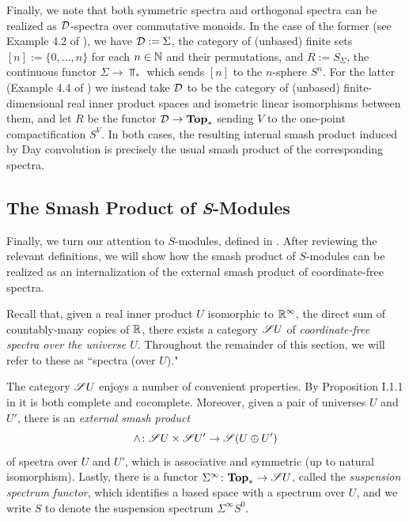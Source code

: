 \documentclass[openany, amssymb, psamsfonts]{amsart}
\theoremstyle{definition}
\numberwithin{equation}{section}
\begin{document}
Finally, we note that both symmetric spectra and orthogonal spectra can be realized as $\mathcal{D}$-spectra over commutative monoids. In the case of the former (see Example 4.2 of \cite{MMSS}), we have $\mathcal{D} := \Sigma$, the category of (unbased) finite sets $[n] := \{0, \dots, n\}$ for each $n \in \mathbb{N}$ and their permutations, and $R := S_\Sigma$, the continuous functor $\Sigma \to \Top_*$ which sends $[n]$ to the $n$-sphere $S^n$. For the latter (Example 4.4 of \cite{MMSS}) we instead take $\mathcal{D}$ to be the category of (unbased) finite-dimensional real inner product spaces and isometric linear isomorphisms between them, and let $R$ be the functor $\mathcal{D} \to \textbf{\textup{Top}}_*$ sending $V$ to the one-point compactification $S^V$. In both cases, the resulting internal smash product induced by Day convolution is precisely the usual smash product of the corresponding spectra.

\subsection{The Smash Product of \textit{S}-Modules}
\label{subsection:s-modules}

Finally, we turn our attention to $S$-modules, defined in \cite{EKMM}. After reviewing the relevant definitions, we will show how the smash product of $S$-modules can be realized as an internalization of the external smash product of coordinate-free spectra.

Recall that, given a real inner product $U$ isomorphic to $\mathbb{R}^\infty$, the direct sum of countably-many copies of $\mathbb{R}$, there exists a category $\mathscr{S} U$ of \emph{coordinate-free spectra over the universe $U$}. Throughout the remainder of this section, we will refer to these as ``spectra (over $U$)."

The category $\mathscr{S} U$ enjoys a number of convenient properties. By Proposition I.1.1 in \cite{EKMM} it is both complete and cocomplete. Moreover, given a pair of universes $U$ and $U'$, there is an \emph{external smash product}
\begin{equation*}
    \wedge \colon \mathscr{S} U \times \mathscr{S} U' \to \mathscr{S}( U \oplus U')
\end{equation*}
of spectra over $U$ and $U'$, which is associative and symmetric (up to natural isomorphism). Lastly, there is a functor $\Sigma^\infty \colon \textbf{\textup{Top}}_* \to \mathscr{S} U$, called the \emph{suspension spectrum functor}, which identifies a based space with a spectrum over $U$, and we write $S$ to denote the suspension spectrum $\Sigma^\infty S^0$.
\end{document}

